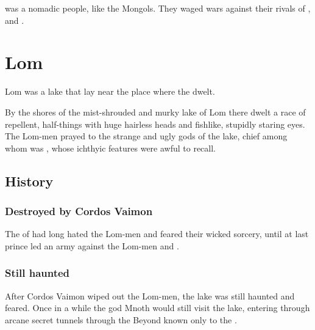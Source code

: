 \Imrath{} was a nomadic people, like the Mongols. 
They waged wars against their rivals of ,  and . 















\section{Lom}
Lom was a lake that lay near the place where the  dwelt.

By the shores of the mist-shrouded and murky lake of Lom there dwelt a race of repellent, half-\human things with huge hairless heads and fishlike, stupidly staring eyes.
The Lom-men prayed to the strange and ugly gods of the lake, chief among whom was , whose ichthyic features were awful to recall. 









\subsection{History}





\subsubsection{Destroyed by Cordos Vaimon}
The \humans of \Imrath had long hated the Lom-men and feared their wicked sorcery, until at last prince  led an army against the Lom-men and .





\subsubsection{Still haunted}
After Cordos Vaimon wiped out the Lom-men, the lake was still haunted and feared.
Once in a while the god Mnoth would still visit the lake, entering through arcane secret tunnels through the Beyond known only to the . 

















